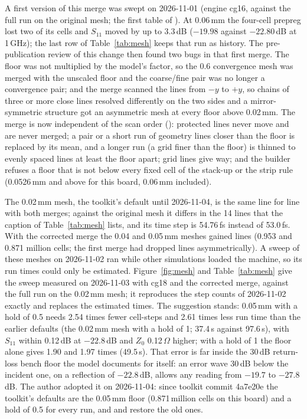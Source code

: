 A first version of this merge was swept on 2026-11-01 (engine cg16, against the full run on the original mesh; the
first table of ). At 0.06\,mm the four-cell prepreg lost two of its
cells and $S_{11}$ moved by up to 3.3\,dB ($-19.98$ against $-22.80$\,dB at 1\,GHz); the last row of
Table~\ref{tab:mesh} keeps that run as history. The pre-publication review of this change then found two bugs in
that first merge. The floor was not multiplied by the model's  factor, so the 0.6 convergence mesh was
merged with the unscaled floor and the coarse/fine pair was no longer a convergence pair; and the merge scanned the
lines from $-y$ to $+y$, so chains of three or more close lines resolved differently on the two sides and a
mirror-symmetric structure got an asymmetric mesh at every floor above 0.02\,mm. The merge is now independent of the
scan order (): protected lines never move and are never merged; a pair or a short run of
geometry lines closer than the floor is replaced by its mean, and a longer run (a grid finer than the floor) is
thinned to evenly spaced lines at least the floor apart; grid lines give way; and the builder refuses a floor that is
not below every fixed cell of the stack-up or the strip rule (0.0526\,mm and above for this board, 0.06\,mm included).

The 0.02\,mm mesh, the toolkit's default until 2026-11-04, is the same line for line with both merges; against
the original mesh it differs in the 14 lines that the caption of Table~\ref{tab:mesh} lists, and its time step is
54.76\,fs instead of 53.0\,fs. With the corrected merge the 0.04 and 0.05\,mm meshes gained lines (0.953 and 0.871
million cells; the first merge had dropped lines asymmetrically). A sweep of these meshes on 2026-11-02 ran while
other simulations loaded the machine, so its run times could only be estimated. Figure~\ref{fig:mesh} and
Table~\ref{tab:mesh} give the sweep measured on 2026-11-03 with cg18 and the corrected merge, against the full run on
the 0.02\,mm mesh; it reproduces the step counts of 2026-11-02 exactly and replaces the estimated
times. The suggestion stands: 0.05\,mm with a hold of 0.5 needs 2.54 times fewer cell-steps and 2.61 times less run
time than the earlier defaults (the 0.02\,mm mesh with a hold of 1; 37.4\,s against 97.6\,s), with $S_{11}$ within
0.12\,dB at $-22.8$\,dB and $Z_0$ 0.12\,$\Omega$ higher; with a hold of 1 the floor alone gives 1.90 and 1.97 times
(49.5\,s). That error is far inside the 30\,dB return-loss bench floor the model documents for itself: an error wave
30\,dB below the incident one, on a reflection of $-22.8$\,dB, allows any reading from $-19.7$ to $-27.8$\,dB. The
author adopted it on 2026-11-04: since toolkit commit 4a7e20e the toolkit's defaults are the 0.05\,mm floor
(0.871\,million cells on this board) and a hold of 0.5 for every run, and  and
 restore the old ones.

